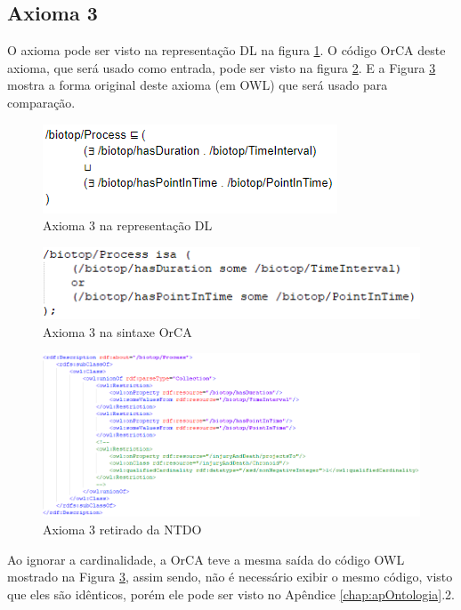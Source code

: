 \documentclass{bcc}
\begin{document}
\subsection{Axioma 3}
O axioma pode ser visto na representação DL na figura \ref{fig:axioma3_dl}. O código OrCA deste axioma, que será usado como entrada, pode ser visto na figura \ref{fig:axioma3_orca}. E a Figura \ref{fig:axioma3_o} mostra a forma original deste axioma (em OWL) que será usado para comparação. 

\begin{figure}[H]
\centering
\includegraphics[width=.5\textwidth]{Figuras/axioma3_dl.png}
\caption{Axioma 3 na representação DL} 
\label{fig:axioma3_dl}
\end{figure}

\begin{figure}[H]
\centering
\includegraphics[width=.7\textwidth]{Figuras/axioma3_orca.png}
\caption{Axioma 3 na sintaxe OrCA} 
\label{fig:axioma3_orca}
\end{figure}

\begin{figure}[H]
\centering
\includegraphics[width=.9\textwidth]{Figuras/axioma3_o.png}
\caption{Axioma 3 retirado da NTDO} 
\label{fig:axioma3_o}
\end{figure}

Ao ignorar a cardinalidade, a OrCA teve a mesma saída do código OWL mostrado na Figura \ref{fig:axioma3_o}, assim sendo, não é necessário exibir o mesmo código, visto que eles são idênticos, porém ele pode ser visto no Apêndice \ref{chap:apOntologia}.2.
\end{document}
